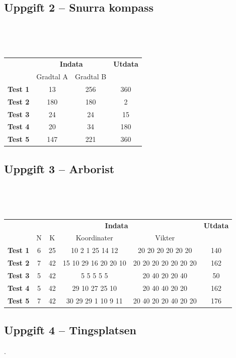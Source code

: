 \documentclass[a4paper,12pt,oneside]{amsbook}
\theoremstyle{test}
\newcommand{\fe}[1]{\textbf{#1}}            %
\begin{document}
\subsection*{Uppgift 2 -- Snurra kompass}
~\\
{\tt 
\begin{tabular}{||l||c|c||c||}\hline\hline
& \multicolumn{2}{c||}{\fe{Indata}} & \multicolumn{1}{c||}{\fe{Utdata}} \\ 
& Gradtal A & Gradtal B &  \\ \hline \hline
\fe{Test 1} & 13  & 256 & 360 \\ \hline
\fe{Test 2} & 180 & 180 & 2 \\ \hline
\fe{Test 3} & 24  & 24  & 15 \\ \hline
\fe{Test 4} & 20  & 34  & 180 \\ \hline
\fe{Test 5} & 147 & 221 & 360 \\ \hline\hline
\end{tabular}
}


\subsection*{Uppgift 3 -- Arborist}

~\\
{\tt 
\begin{tabular}{||l||c|c|c|c||c||}\hline\hline
& \multicolumn{4}{c||}{\fe{Indata}} & \fe{Utdata} \\ 
& N & K & Koordinater & Vikter &  \\ \hline \hline
\fe{Test 1} & 6 & 25 & 10 2 1 25 14 12 & 20 20 20 20 20 20 & 140 \\ \hline
\fe{Test 2} & 7 & 42 & 15 10 29 16 20 20 10 & 20 20 20 20 20 20 20 & 162 \\ \hline
\fe{Test 3} & 5 & 42 & 5 5 5 5 5 & 20 40 20 20 40 & 50 \\ \hline
\fe{Test 4} & 5 & 42 & 29 10 27 25 10 & 20 40 40 20 20 & 162 \\ \hline
\fe{Test 5} & 7 & 42 & 30 29 29 1 10 9 11 & 20 40 20 20 40 20 20 & 176 \\ \hline
\hline\hline
\end{tabular}
}
\vspace{1cm}

\newpage

\subsection*{Uppgift 4 -- Tingsplatsen} .
\end{document}
